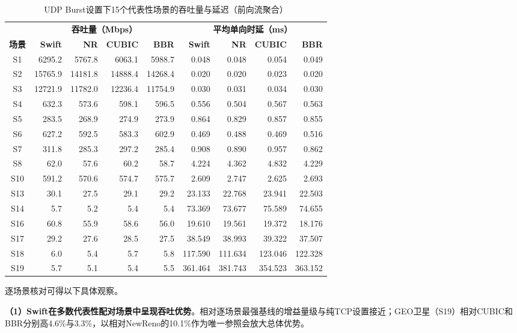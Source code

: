 \begin{table}[htbp]
\centering
\caption{UDP Burst设置下15个代表性场景的吞吐量与延迟（前向流聚合）}
\label{tab:udp-burst-headline}
\footnotesize
\setlength{\tabcolsep}{4pt}
\begin{tabular}{|c|rrrr|rrrr|}
\hline
& \multicolumn{4}{c|}{\textbf{吞吐量（Mbps）}} & \multicolumn{4}{c|}{\textbf{平均单向时延（ms）}} \\
\textbf{场景} & \textbf{Swift} & \textbf{NR} & \textbf{CUBIC} & \textbf{BBR} & \textbf{Swift} & \textbf{NR} & \textbf{CUBIC} & \textbf{BBR} \\
\hline
S1 & 6295.2 & 5767.8 & 6063.1 & 5988.7 & 0.048 & 0.048 & 0.054 & 0.049 \\
S2 & 15765.9 & 14181.8 & 14888.4 & 14268.4 & 0.020 & 0.020 & 0.023 & 0.020 \\
S3 & 12721.9 & 11782.0 & 12236.4 & 11754.9 & 0.030 & 0.031 & 0.034 & 0.030 \\
S4 & 632.3 & 573.6 & 598.1 & 596.5 & 0.556 & 0.504 & 0.567 & 0.563 \\
S5 & 283.5 & 268.9 & 274.9 & 273.9 & 0.864 & 0.829 & 0.857 & 0.855 \\
S6 & 627.2 & 592.5 & 583.3 & 602.9 & 0.469 & 0.488 & 0.469 & 0.516 \\
S7 & 311.8 & 285.3 & 297.2 & 285.4 & 0.908 & 0.890 & 0.957 & 0.862 \\
S8 & 62.0 & 57.6 & 60.2 & 58.7 & 4.224 & 4.362 & 4.832 & 4.229 \\
S10 & 591.2 & 570.6 & 574.7 & 575.7 & 2.609 & 2.747 & 2.625 & 2.693 \\
S13 & 30.1 & 27.5 & 29.1 & 29.2 & 23.133 & 22.768 & 23.941 & 22.503 \\
S14 & 5.7 & 5.2 & 5.4 & 5.4 & 73.369 & 73.677 & 75.589 & 74.655 \\
S16 & 60.8 & 55.9 & 58.6 & 56.0 & 19.610 & 19.561 & 19.372 & 18.176 \\
S17 & 29.2 & 27.6 & 28.5 & 27.5 & 38.549 & 38.993 & 39.322 & 37.507 \\
S18 & 6.0 & 5.4 & 5.7 & 5.8 & 117.590 & 111.634 & 123.046 & 122.328 \\
S19 & 5.7 & 5.1 & 5.4 & 5.5 & 361.464 & 381.743 & 354.523 & 363.152 \\
\hline
\end{tabular}
\end{table}

逐场景核对可得以下具体观察。

\textbf{（1）Swift在多数代表性配对场景中呈现吞吐优势}。相对逐场景最强基线的增益量级与纯TCP设置接近；GEO卫星（S19）相对CUBIC和BBR分别高4.6\%与3.3\%，以相对NewReno的10.1\%作为唯一参照会放大总体优势。


